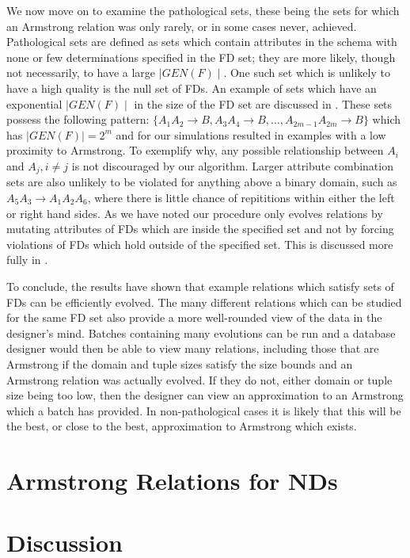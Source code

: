 We now move on to examine the pathological sets, these being
the sets for which an Armstrong relation was only rarely,
or in some cases never, achieved. Pathological sets are
defined as sets which contain attributes in the schema with none or
few
determinations specified in the FD set; they are more likely,
though not necessarily, to have a large $\mid GEN(F) \mid$. One
such set which is unlikely to have a high quality is the null
set of FDs. An example of sets which have an exponential $\mid GEN(F) \mid$
in the size of the FD set are discussed in \cite{bdfs84}.
These sets possess the following pattern: $\{ A_1A_2 \to B, A_3A_4 \to B, \ldots , A_{2m-1}A_{2m} \to B \}$ which has  $\mid GEN(F) \mid = 2^m$ and for
our simulations resulted in examples with a low proximity to Armstrong.
To exemplify why, any possible relationship between $A_i$ and $A_j, i
\not= j$ is not discouraged by our algorithm. Larger attribute combination sets are also
unlikely to be violated for anything above a binary domain, such as
$A_5A_3 \to A_1A_2A_6$, where there is little chance of repititions
within either the left or right hand sides.
As we have noted
our procedure only evolves relations by mutating attributes of FDs which are
inside the specified set and not by forcing violations of FDs which
hold outside of the specified set. This is discussed more fully in \cite{cl96}.

\medskip


To conclude, the results have shown that example relations which satisfy sets
of FDs can be efficiently evolved. The many different
relations which can be studied for the same FD set also provide a
more well-rounded view of the data in the designer's mind.
Batches containing
many evolutions can be run and a database designer would then be able
to view many relations, including those that are Armstrong if the domain
and tuple sizes satisfy the size bounds and an Armstrong relation
was actually evolved.  If they do not, either domain
or tuple size being too low, then the designer can view an
approximation to an Armstrong which a batch has provided. In
non-pathological cases it is likely that
this will be the best, or close to the best, approximation to Armstrong
which exists.



\section{Armstrong Relations for NDs}\label{sec:nd_ar}


\section{Discussion}\label{sec:nd_disc}



